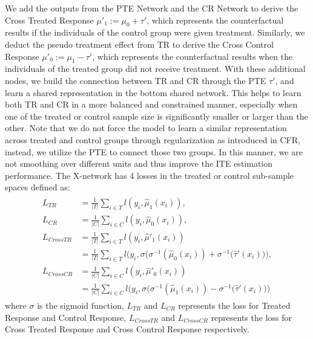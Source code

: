 \documentclass[sigconf]{acmart}
\begin{document}
We add the outputs from the PTE Network and the CR Network to derive the Cross Treated Response $\mu'_{1} := \mu_{0} + \tau'$, which represents the counterfactual results if the individuals of the control group were given treatment. Similarly, we deduct the pseudo treatment effect from TR to derive the Cross Control Response $\mu'_{0} := \mu_{1} - \tau'$, which represents the counterfactual results when the individuals of the treated group did not receive treatment. With these additional nodes, we build the connection between TR and CR through the PTE $\tau'$, and learn a shared representation in the bottom shared network. This helps to learn both TR and CR in a more balanced and constrained manner, especially when one of the treated or control sample size is significantly smaller or larger than the other. Note that we do not force the model to learn a similar representation across treated and control groups through regularization as introduced in CFR\cite{Shalit2017}, instead, we utilize the PTE to connect those two groups. In this manner, we are not smoothing over different units and thus improve the ITE estimation performance. The X-network has 4 losses in the treated or control sub-sample spaces defined as:
\begin{align}
    \label{Loss Xnetwork}
    \begin{aligned}
    L_{TR} &= \frac{1}{|T|} \sum_{i \in T} l(y_i, \hat\mu_1(x_i)), \\
    L_{CR} &= \frac{1}{|C|} \sum_{i \in C} l(y_i, \hat\mu_0(x_i)), \\
    L_{Cross TR} &= \frac{1}{|T|}\sum_{i \in T} l(y_i, \hat\mu'_1(x_i)) \\
        &= \frac{1}{|T|} \sum_{i \in T} l\Big(y_i, \sigma\big(\sigma^{-1}(\hat\mu_0(x_i)) + \sigma^{-1}(\hat\tau'(x_i)\big)\Big), \\
    L_{Cross CR} &= \frac{1}{|C|} \sum_{i \in C} l(y_i, \hat\mu'_0(x_i)) \\
        &= \frac{1}{|C|} \sum_{i \in C} l\Big(y_i, \sigma\big(\sigma^{-1}(\hat\mu_1(x_i)) - \sigma^{-1}(\hat\tau'(x_i)\big)\Big)
    \end{aligned}
\end{align}
where $\sigma$ is the sigmoid function, $L_{TR}$ and $L_{CR}$ represents the loss for Treated Response and Control Response, $L_{CrossTR}$ and $L_{CrossCR}$ represents the loss for Cross Treated Response and Cross Control Response respectively. 
\end{document}
